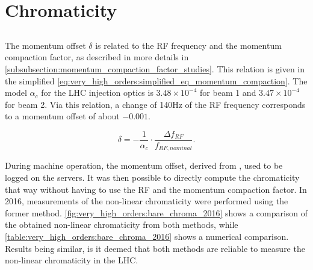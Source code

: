 
\section{Chromaticity}


\subsection{}

The momentum offset $\delta$ is related to the RF frequency and the momentum compaction factor, as
described in more details in \cref{subsubsection:momentum_compaction_factor_studies}. This relation
is given in the simplified \cref{eq:very_high_orders:simplified_eq_momentum_compaction}.
The model $\alpha_c$ for the LHC injection optics is $3.48 \times 10^{-4}$ for beam 1 and $3.47
\times 10^{-4}$ for beam 2. Via this relation, a change of 140Hz of the RF frequency corresponds to
a momentum offset of about $-0.001$.

\begin{equation}
    \delta = -\frac{1}{\alpha_c} \cdot \frac{\Delta f_{RF}}{f_{RF,nominal}}.
    \label{eq:very_high_orders:simplified_eq_momentum_compaction}
\end{equation}

During machine operation, the momentum offset, derived from , used to be logged on
the servers. It was then possible to directly compute the chromaticity that way without having to
use the RF and the momentum compaction factor.
In 2016, measurements of the non-linear chromaticity were performed using the former method.
\cref{fig:very_high_orders:bare_chroma_2016} shows a comparison of the obtained non-linear 
chromaticity from both methods, while \cref{table:very_high_orders:bare_chroma_2016} shows a
numerical comparison. Results being similar, is it deemed that both methods are reliable to measure
the non-linear chromaticity in the LHC.

